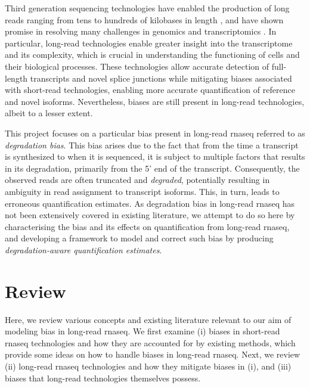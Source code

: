 
Third generation sequencing technologies have enabled the production of long reads ranging from tens to hundreds of kilobases in length \cite{Pollard2018}, and have shown promise in resolving many challenges in genomics and transcriptomics \cite{Bolisetty2015, Byrne2017, DeCoster2019, Liu2019, Mantere2019, Nurk2021}. In particular, long-read technologies enable greater insight into the transcriptome and its complexity, which is crucial in understanding the functioning of cells and their biological processes. These technologies allow accurate detection of full-length transcripts and novel splice junctions while mitigating biases associated with short-read technologies, enabling more accurate quantification of reference and novel isoforms. Nevertheless, biases are still present in long-read technologies, albeit to a lesser extent. 

This project focuses on a particular bias present in long-read \gls{rnaseq} referred to as \textit{degradation bias}. This bias arises due to the fact that from the time a transcript is synthesized to when it is sequenced, it is subject to multiple factors that results in its degradation, primarily from the 5' end of the transcript. Consequently, the observed reads are often truncated and \textit{degraded}, potentially resulting in ambiguity in read assignment to transcript isoforms. This, in turn, leads to erroneous quantification estimates. As degradation bias in long-read \gls{rnaseq} has not been extensively covered in existing literature, we attempt to do so here by characterising the bias and its effects on quantification from long-read \gls{rnaseq}, and developing a framework to model and correct such bias by producing \textit{degradation-aware quantification estimates}.

\section{Review}

Here, we review various concepts and existing literature relevant to our aim of modeling bias in long-read \gls{rnaseq}. We first examine (i) biases in short-read \gls{rnaseq} technologies and how they are accounted for by existing methods, which provide some ideas on how to handle biases in long-read \gls{rnaseq}. Next, we review (ii) long-read \gls{rnaseq} technologies and how they mitigate biases in (i), and (iii) biases that long-read technologies themselves possess. 

